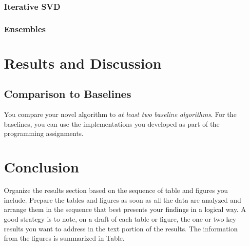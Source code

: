 \documentclass[10pt,conference,compsocconf]{IEEEtran}
\begin{document}
    \subsubsection{Iterative SVD}

    \subsubsection{Ensembles}


    \section{Results and Discussion}

    \subsection{Comparison to Baselines}

    You compare your novel algorithm to \emph{at least two baseline
    algorithms}. For the baselines, you can use the implementations you
    developed as part of the programming assignments.


    \section{Conclusion}

    Organize the results section based on the sequence of table and
    figures you include. Prepare the tables and figures as soon as all
    the data are analyzed and arrange them in the sequence that best
    presents your findings in a logical way. A good strategy is to note,
    on a draft of each table or figure, the one or two key results you
    want to address in the text portion of the results.
    The information from the figures is
    summarized in Table.




    
    
\end{document}

